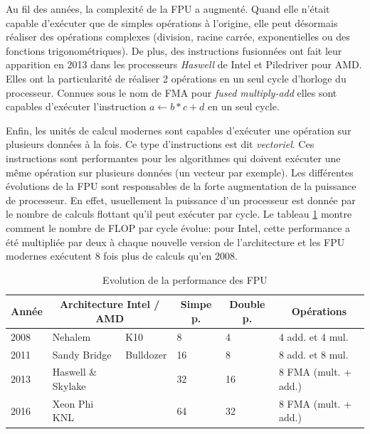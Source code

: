         Au fil des années, la complexité de la FPU a augmenté. Quand elle n'était capable d'exécuter que de simples opérations à l'origine, elle peut désormais réaliser des opérations complexes (division, racine carrée, exponentielles ou des fonctions trigonométriques).  De plus, des instructions fusionnées ont fait leur apparition en 2013 dans les processeurs \textit{Haswell} de Intel et Piledriver pour AMD. Elles ont la particularité de réaliser 2 opérations en un seul cycle d'horloge du processeur. Connues sous le nom de FMA pour \textit{fused multiply-add} elles sont capables d'exécuter l'instruction $a \leftarrow b * c + d$ en un seul cycle. 
        
        Enfin, les unités de calcul modernes sont capables d'exécuter une opération sur plusieurs données à la fois. Ce type d'instructions est dit \textit{vectoriel}. Ces instructions sont performantes pour les algorithmes qui doivent exécuter une même opération sur plusieurs données (un vecteur par exemple).
        Les différentes évolutions de la FPU sont responsables de la forte augmentation de la puissance de processeur. En effet, usuellement la puissance d'un processeur est donnée par le nombre de calculs flottant qu'il peut exécuter par cycle. Le tableau \ref{tab_FPU} montre comment le nombre de FLOP par cycle évolue: pour Intel, cette performance a été multipliée par deux à chaque nouvelle version de l'architecture et les FPU modernes exécutent 8 fois plus de calculs qu'en 2008.
        
        \begin{table}[]
        \centering
        \label{my-label}
        \begin{tabular}{|l|l|l|l|l|l|}
        \hline
        \multicolumn{1}{|c|}{\textbf{Année}} & \multicolumn{2}{c|}{\textbf{Architecture Intel / AMD}}     & \multicolumn{1}{c|}{\textbf{Simpe p.}} & \multicolumn{1}{c|}{\textbf{Double p.}} & \multicolumn{1}{c|}{\textbf{Opérations}} \\ \hline
        2008                                 & Nehalem                          & K10                     & 8                                      & 4                                       & 4 add. et 4 mul.         \\ \hline
        2011                                 & Sandy Bridge                     & Bulldozer               & 16                                     & 8                                       & 8 add. et 8 mul.         \\ \hline
        2013                                 & Haswell \& Skylake               &                         & 32                                     & 16                                      & 8 FMA (mult. + add.)        \\ \hline
        2016                                 & Xeon Phi KNL &                         & 64                                     & 32                                      & 8 FMA (mult. + add.)        \\ \hline
        \end{tabular}
        \caption{Evolution de la performance des FPU}

        \label{tab_FPU}
        \end{table}
        

